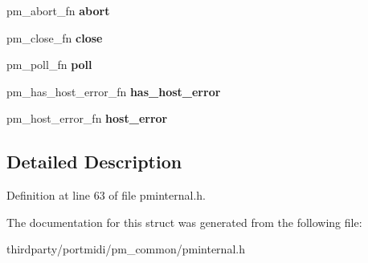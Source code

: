 \begin{DoxyCompactItemize}
pm\+\_\+abort\+\_\+fn {\bfseries abort}
\item 
\mbox{\label{structpm__fns__node_a57b587fb7c65dfa19368b48f6a1a1c2a}} 
pm\+\_\+close\+\_\+fn {\bfseries close}
\item 
\mbox{\label{structpm__fns__node_a182a3f95a854ae3e4f89864a0476f90b}} 
pm\+\_\+poll\+\_\+fn {\bfseries poll}
\item 
\mbox{\label{structpm__fns__node_a06e0f8783e9b2809d2c0df54c003834b}} 
pm\+\_\+has\+\_\+host\+\_\+error\+\_\+fn {\bfseries has\+\_\+host\+\_\+error}
\item 
\mbox{\label{structpm__fns__node_aa85a8201a70439167b4df4dc4c82abf6}} 
pm\+\_\+host\+\_\+error\+\_\+fn {\bfseries host\+\_\+error}
\end{DoxyCompactItemize}


\subsection{Detailed Description}


Definition at line 63 of file pminternal.\+h.



The documentation for this struct was generated from the following file\+:\begin{DoxyCompactItemize}
\item 
thirdparty/portmidi/pm\+\_\+common/pminternal.\+h\end{DoxyCompactItemize}
